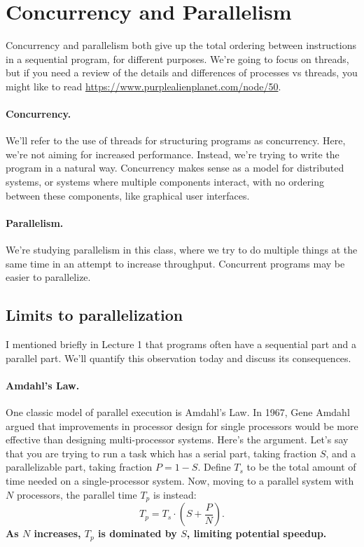 \section*{Concurrency and Parallelism}
Concurrency and parallelism both give up the
total ordering between instructions in a sequential program, for
different purposes. We're going to focus on threads, but if you need a review of the details and differences of processes vs threads, you might like to read   \url{https://www.purplealienplanet.com/node/50}. 

\paragraph{Concurrency.} We'll refer to the use of threads for
structuring programs as concurrency. Here, we're not aiming
for increased performance. Instead, we're trying to write the program
in a natural way. Concurrency makes sense as a model for distributed
systems, or systems where multiple components interact, with no ordering
between these components, like graphical user interfaces.

\paragraph{Parallelism.} We're studying parallelism in this class, where
we try to do multiple things at the same time in an attempt to increase
throughput. Concurrent programs may be easier to parallelize.

\subsection*{Limits to parallelization}
I mentioned briefly in Lecture 1 that programs often have a sequential
part and a parallel part. We'll quantify this observation today
and discuss its consequences.


\paragraph{Amdahl's Law.} One classic model of parallel execution
is Amdahl's Law. In 1967, Gene Amdahl argued that improvements in
processor design for single processors would be more effective than
designing multi-processor systems. Here's the argument. Let's say that
you are trying to run a task which has a serial part, taking fraction 
$S$, and a parallelizable part, taking fraction $P = 1-S$. Define $T_s$
to be the total 
amount of time needed on a single-processor system.
Now, moving to a parallel system with $N$ processors, the parallel
time $T_p$ is instead:
\[ T_p = T_s \cdot (S + \frac{P}{N}). \]
{\bf As $N$ increases, $T_p$ is dominated by $S$, limiting potential
speedup.}

